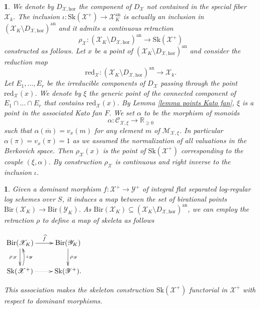 \documentclass{amsart}%
\numberwithin{equation}{subsection}
\theoremstyle{plain2}
\theoremstyle{definition2}
\theoremstyle{stepstyle}
\theoremstyle{point}
\theoremstyle{subpoint}
\newtheorem{subpoint}[equation]{}%
\newcommand{\spa}[1]{\begin{subpoint}#1\end{subpoint}}           %
\newcommand{\R}{\ensuremath{\mathbb{R}}}
\newcommand{\cX}{\ensuremath{\mathscr{X}}}
\newcommand{\caM}{\ensuremath{\mathcal{M}}}
\newcommand{\caC}{\ensuremath{\mathcal{C}}}
\newcommand{\cY}{\ensuremath{\mathscr{Y}}}
\renewcommand{\R}{\ensuremath{\mathbb{R}}}
\renewcommand{\cY}{\ensuremath{\mathscr{Y}}}
\newcommand{\redu}{\mathrm{red}}
\newcommand{\an}{\mathrm{an}}
\newcommand{\Sk}{\mathrm{Sk}}
\begin{document}
\spa{We denote by $D_{\cX,\text{hor}}$ the component of $D_\cX$ not contained in the special fiber $\cX_k$. The inclusion $\iota: \Sk(\cX^+) \rightarrow \cX_K^\an$ is actually an inclusion in $(\cX_K \setminus D_{\cX, \text{hor}})^\an$ and it admits a continuous retraction $$\rho_\cX: (\cX_K \setminus D_{\cX, \text{hor}})^\an\rightarrow \Sk(\cX^+)$$ constructed as follows. Let $x$ be a point of $(\cX_K \setminus D_{\cX, \text{hor}})^\an$ and consider the reduction map $$\redu_{\cX}:(\cX_K \setminus D_{\cX, \text{hor}})^\an \rightarrow \cX_k.$$ Let $E_1, \ldots, E_r$ be the irreducible components of $D_\cX$ passing through the point $\redu_\cX(x)$. We denote by $\xi$ the generic point of the connected component of $E_1 \cap \ldots \cap E_r$ that contains $\redu_\cX(x)$. By Lemma \ref{lemma points Kato fan}, $\xi$ is a point in the associated Kato fan $F$. We set $\alpha$ to be the morphism of monoids $$\alpha: \caC_{\cX,\xi} \rightarrow \R_{\geqslant 0 }$$ such that $\alpha(\overline{m}) = v_x(m)$ for any element $m$ of $\caM_{\cX,\xi}$. In particular $\alpha(\pi)= v_x(\pi)=1$ as we assumed the normalization of all valuations in the Berkovich space. Then $\rho_\cX(x)$ is the point of $\Sk(\cX^+)$ corresponding to the couple $(\xi,\alpha)$. By construction $\rho_\cX$ is continuous and right inverse to the inclusion $\iota$. 
}
\spa{Given a dominant morphism $f: \cX^+ \rightarrow \cY^+$ of integral flat separated log-regular log schemes over $S$, it induces a map between the set of birational points $\text{Bir}(\cX_K) \rightarrow \text{Bir}(\cY_K)$. As $\text{Bir}(\cX_K) \subseteq  (\cX_K \setminus D_{\cX, \text{hor}})^\an$, we can employ the retraction $\rho$ to define a map of skeleta as follows
\begin{center}
$\begin{gathered}
\xymatrixcolsep{2pc} \xymatrix{
 \text{Bir}(\cX_K) \ar[r]^-{\widehat{f}} \ar[d]_{\rho_\cX} &  \text{Bir}(\cY_K) \ar[d]^{\rho_\cY}\\
  \Sk(\cX^+) \ar@{.>}[r]^{} \ar@/_/[u]_-{\iota_\cY}  & \Sk(\cY^+).
}
\end{gathered}$\end{center} This association makes the skeleton construction $\Sk(\cX^+)$ functorial in $\cX^+$ with respect to dominant morphisms.
}
\end{document}
